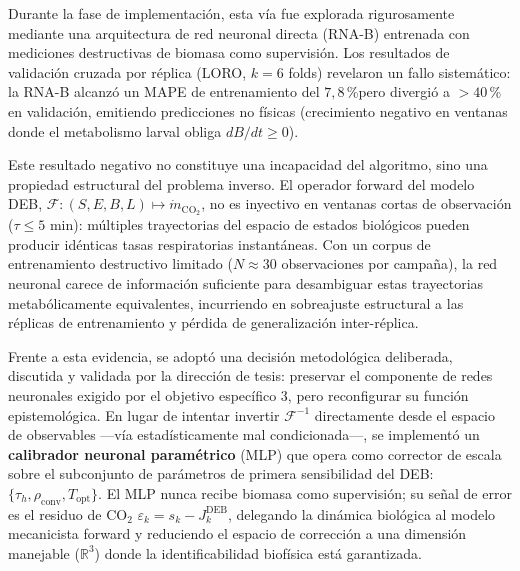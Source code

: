 Durante la fase de implementación, esta vía fue explorada rigurosamente mediante 
una arquitectura de red neuronal directa (RNA-B) entrenada con mediciones destructivas 
de biomasa como supervisión. Los resultados de validación cruzada por réplica 
(LORO, $k=6$ folds) revelaron un fallo sistemático: la RNA-B alcanzó un MAPE de 
entrenamiento del $7{,}8$\,\%pero divergió a $>40\,$\% en validación, emitiendo 
predicciones no físicas (crecimiento negativo en ventanas donde el metabolismo 
larval obliga $dB/dt \geq 0$). 

Este resultado negativo no constituye una incapacidad del algoritmo, sino una 
propiedad estructural del problema inverso. El operador forward del modelo DEB, 
$\mathcal{F}: (S,E,B,L) \mapsto \dot{m}_{\mathrm{CO_2}}$, no es inyectivo en ventanas 
cortas de observación ($\tau \leq 5$ min): múltiples trayectorias del espacio de 
estados biológicos pueden producir idénticas tasas respiratorias instantáneas. 
Con un corpus de entrenamiento destructivo limitado ($N \approx 30$ observaciones 
por campaña), la red neuronal carece de información suficiente para desambiguar 
estas trayectorias metabólicamente equivalentes, incurriendo en sobreajuste 
estructural a las réplicas de entrenamiento y pérdida de generalización inter-réplica.

Frente a esta evidencia, se adoptó una decisión metodológica deliberada, discutida 
y validada por la dirección de tesis: preservar el componente de redes neuronales 
exigido por el objetivo específico 3, pero reconfigurar su función epistemológica. 
En lugar de intentar invertir $\mathcal{F}^{-1}$ directamente desde el espacio de 
observables —vía estadísticamente mal condicionada—, se implementó un 
\textbf{calibrador neuronal paramétrico} (MLP) que opera como corrector de escala 
sobre el subconjunto de parámetros de primera sensibilidad del DEB: 
$\{\tau_h, \rho_{\mathrm{conv}}, T_{\mathrm{opt}}\}$. El MLP nunca recibe biomasa como 
supervisión; su señal de error es el residuo de CO$_2$ $\varepsilon_k = s_k - J_k^{\mathrm{DEB}}$, 
delegando la dinámica biológica al modelo mecanicista forward y reduciendo el espacio 
de corrección a una dimensión manejable ($\mathbb{R}^3$) donde la identificabilidad 
biofísica está garantizada.

